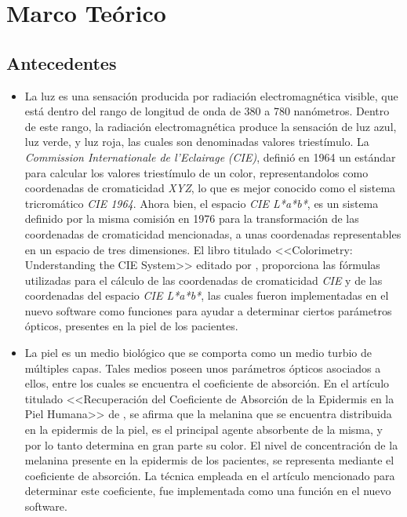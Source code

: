 \chapter{\label{cap:2}Marco Te\'{o}rico}

	\section{Antecedentes}	
		\begin{itemize}
		
			\item
				La luz es una sensaci\'{o}n producida por radiaci\'{o}n electromagn\'{e}tica visible, que est\'{a} dentro del rango de longitud de onda de 380 a 780 nan\'{o}metros. Dentro de este rango, la radiaci\'{o}n electromagn\'{e}tica produce la sensaci\'{o}n de luz azul, luz verde, y luz roja, las cuales son denominadas valores triest\'{i}mulo. La \textit{\mbox{Commission} Internationale de l'Eclairage} \textit{(CIE)}, defini\'{o} en 1964 un est\'{a}ndar para calcular los valores triest\'{i}mulo de un color, representandolos como coordenadas de cromaticidad \textit{XYZ}, lo que es mejor conocido como el sistema tricrom\'{a}tico \textit{CIE 1964}. Ahora bien, el espacio \textit{CIE L*a*b*}, es un sistema definido por la misma comisi\'{o}n en 1976 para la \mbox{transformaci\'{o}n} de las coordenadas de cromaticidad mencionadas, a unas coordenadas representables en un espacio de tres dimensiones. El libro titulado <<Colorimetry: Understanding the CIE System>> editado por \cite{Schanda}, proporciona las f\'{o}rmulas utilizadas para el c\'{a}lculo de las coordenadas de cromaticidad \textit{CIE} y de las coordenadas  del espacio \textit{CIE L*a*b*}, las cuales fueron implementadas en el nuevo software como funciones para ayudar a determinar ciertos par\'{a}metros \'{o}pticos, presentes en la piel de los pacientes.
			
			\item La piel es un medio biol\'{o}gico que se comporta como un medio turbio de m\'{u}ltiples capas. Tales medios poseen unos par\'{a}metros \'{o}pticos asociados a ellos, entre los cuales se encuentra el coeficiente de absorci\'{o}n. En el art\'{i}culo titulado <<Recuperaci\'{o}n del Coeficiente de Absorci\'{o}n de la Epidermis en la Piel Humana>> de \cite{Narea}, se afirma que la melanina que se encuentra distribuida en la epidermis de la piel, es el  principal agente absorbente de la misma, y por lo tanto determina en gran parte su color. El nivel de concentraci\'{o}n de la melanina presente en la epidermis de los pacientes, se representa mediante el coeficiente de absorci\'{o}n. La t\'{e}cnica empleada en el art\'{i}culo mencionado para determinar este coeficiente, fue implementada como una funci\'{o}n en el nuevo software.
			

\end{itemize}
